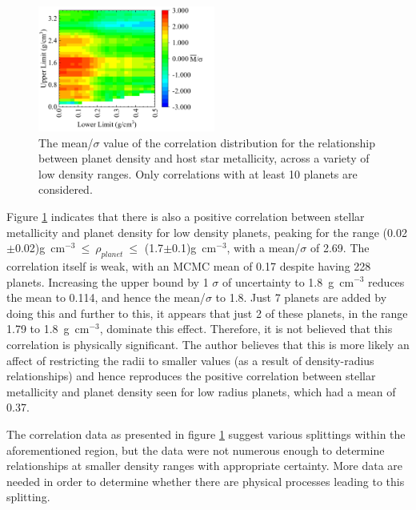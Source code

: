 \documentclass[a4paper,twocolumn,12pt]{article}
\begin{document}
\begin{figure}[h!]
    \centering
    \includegraphics[width=0.52\textwidth]{Graphs/FeH vs Density correlations - Density ranges (low).pdf}
    \caption{The mean/$\sigma$ value of the correlation distribution for the relationship between planet density and host star metallicity, across a variety of low density ranges. Only correlations with at least 10 planets are considered.}
    \label{figure: Fe/H vs Density correlations - Density ranges (Low)}
\end{figure}

Figure \ref{figure: Fe/H vs Density correlations - Density ranges (Low)} indicates that there is also a positive correlation between stellar metallicity and planet density for low density planets, peaking for the range (0.02$\pm$0.02)g~cm$^{-3}~\leq~\rho_{planet}~\leq$ (1.7$\pm$0.1)g~cm$^{-3}$, with a mean/$\sigma$ of 2.69. The correlation itself is weak, with an MCMC mean of 0.17 despite having 228 planets. Increasing the upper bound by 1 $\sigma$ of uncertainty to 1.8~g~cm$^{-3}$ reduces the mean to 0.114, and hence the mean/$\sigma$ to 1.8. Just 7 planets are added by doing this and further to this, it appears that just 2 of these planets, in the range 1.79 to 1.8~g~cm$^{-3}$, dominate this effect. Therefore, it is not believed that this correlation is physically significant. The author believes that this is more likely an affect of restricting the radii to smaller values (as a result of density-radius relationships) and hence reproduces the positive correlation between stellar metallicity and planet density seen for low radius planets, which had a mean of 0.37.

The correlation data as presented in figure \ref{figure: Fe/H vs Density correlations - Density ranges (Low)} suggest various splittings within the aforementioned region, but the data were not numerous enough to determine relationships at smaller density ranges with appropriate certainty. More data are needed in order to determine whether there are physical processes leading to this splitting.
\end{document}
